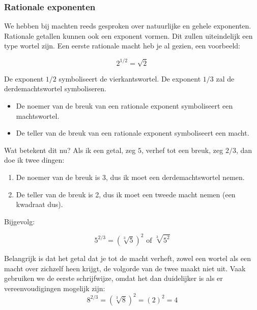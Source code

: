 \subsubsection{Rationale exponenten}

We hebben bij machten reeds gesproken over natuurlijke en gehele exponenten. Rationale getallen kunnen ook een exponent vormen. Dit zullen uiteindelijk een type wortel zijn. Een eerste rationale macht heb je al gezien, een voorbeeld:

\begin{equation*}
2^{1/2}=\sqrt{2}
\end{equation*}

De exponent $1/2$ symboliseert de vierkantswortel. De exponent $1/3$ zal de derdemachtswortel symboliseren.


\begin{definitie}
	
\begin{itemize}
\item De noemer van de breuk van een rationale exponent symboliseert een machtswortel.
\item De teller van de breuk van een rationale exponent symboliseert een macht.
\end{itemize}
\end{definitie}

Wat betekent dit nu? Als ik een getal, zeg $5$, verhef tot een breuk, zeg $2/3$, dan doe ik twee dingen:

\begin{enumerate}
	\item De noemer van de breuk is 3, dus ik moet een derdemachtswortel nemen.
	\item De teller van de breuk is 2, dus ik moet een tweede macht nemen (een kwadraat dus).
\end{enumerate}

Bijgevolg:

\begin{equation*}
5^{2/3} = (\sqrt[3]{5})^2 \text{ of } \sqrt[3]{5^2}
\end{equation*}

Belangrijk is dat het getal dat je tot de macht verheft, zowel een wortel als een macht over zichzelf heen krijgt, de volgorde van de twee maakt niet uit. Vaak gebruiken we de eerste schrijfwijze, omdat het dan duidelijker is als er vereenvoudigingen mogelijk zijn:
\begin{equation*}
8^{2/3} = (\sqrt[3]{8})^2 = (2)^2 = 4
\end{equation*}

